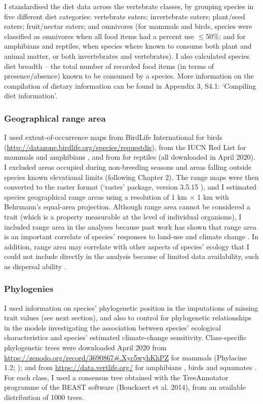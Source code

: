 I standardised the diet data across the vertebrate classes, by grouping species in five different diet categories: vertebrate eaters; invertebrate eaters; plant/seed eaters; fruit/nectar eaters; and omnivores  (for mammals and birds, species were classified as omnivores when all food items had a percent use $\leq$50\%; and for amphibians and reptiles, when species where known to consume both plant and animal matter, or both invertebrates and vertebrates). I also calculated species diet breadth -- the total number of recorded food items (in terms of presence/absence) known to be consumed by a species. More information on the compilation of dietary information can be found in Appendix 3, S4.1: `Compiling diet information'. 

\subsubsection{Geographical range area}
I used extent-of-occurrence maps from BirdLife International for birds (\url{http://datazone.birdlife.org/species/requestdis}), from the IUCN Red List for mammals and amphibians \citep{IUCN2020}, and from \citet{Roll2017} for reptiles (all downloaded in April 2020). I excluded areas occupied during non-breeding seasons and areas falling outside species known elevational limits (following Chapter 2). The range maps were then converted to the raster format (`raster' package, version 3.5.15 \citet{rasterpackage}), and I estimated species geographical range areas using a resolution of 1 km $\times$ 1 km with Behrmann's equal-area projection.  Although range area cannot be considered a trait (which is a property measurable at the level of individual organisms), I included range area in the analyses because past work has shown that range area is an important correlate of species' responses to land-use \citep{Newbold2018a} and climate change \citep{Thuiller2005}. In addition, range area may correlate with other aspects of species' ecology that I could not include directly in the analysis because of limited data availability, such as dispersal ability \citep{Capurucho2020}.

\subsubsection{Phylogenies}
I used information on species' phylogenetic position in the imputations of missing trait values (see next section), and also to control for phylogenetic relationships in the models investigating the association between species' ecological characteristics and species' estimated climate-change sensitivity. Class-specific phylogenetic trees were downloaded April 2020 from \url{https://zenodo.org/record/3690867#.Xyc5wyhKhPZ} for mammals (Phylacine 1.2; \citet{Faurby2018, Faurby2020}); and from \url{https://data.vertlife.org/} for amphibians \citep{Jetz2018}, birds \citep{Jetz2012} and squamates \citep{Tonini2016}. For each class, I used a consensus tree obtained with the TreeAnnotator programme of the BEAST software (Bouckaert et al. 2014), from an available distribution of 1000 trees. 

